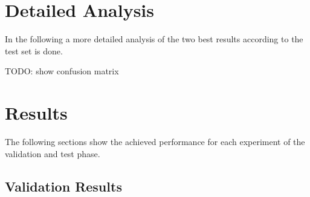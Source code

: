 \documentclass[draft,final,oneside]{vutinfth} %
\begin{document}
\section{Detailed Analysis}

In the following a more detailed analysis of the two best results according to the test set is done.

TODO: show confusion matrix


\section{Results}

The following sections show the achieved performance for each experiment of the validation
and test phase.


\subsection{Validation Results}
\end{document}

